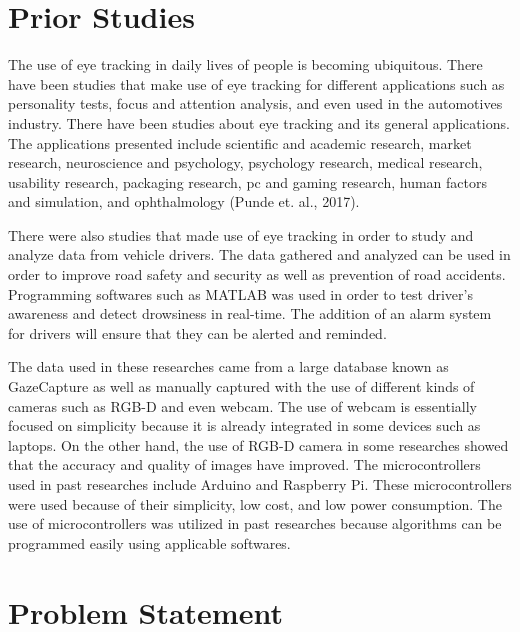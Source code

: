 \section{Prior Studies}

The use of eye tracking in daily lives of people is becoming ubiquitous. There have been studies that make use of eye tracking for different applications such as personality tests, focus and attention analysis, and even used in the automotives industry. There have been studies about eye tracking and its general applications. The applications presented include scientific and academic research, market research, neuroscience and psychology, psychology research, medical research, usability research, packaging research, pc and gaming research, human factors and simulation, and ophthalmology (Punde et. al., 2017). 

There were also studies that made use of eye tracking in order to study and analyze data from vehicle drivers. The data gathered and analyzed can be used in order to improve road safety and security as well as prevention of road accidents. Programming softwares such as MATLAB was used in order to test driver’s awareness and detect drowsiness in real-time. The addition of an alarm system for drivers will ensure that they can be alerted and reminded. 

The data used in these researches came from a large database known as GazeCapture as well as manually captured with the use of different kinds of cameras such as RGB-D and even webcam. The use of webcam is essentially focused on simplicity because it is already integrated in some devices such as laptops. On the other hand, the use of RGB-D camera in some researches showed that the accuracy and quality of images have improved. The microcontrollers used in past researches include Arduino and Raspberry Pi. These microcontrollers were used because of their simplicity, low cost, and low power consumption. The use of microcontrollers was utilized in past researches because algorithms can be programmed easily using applicable softwares.


\section{Problem Statement}


